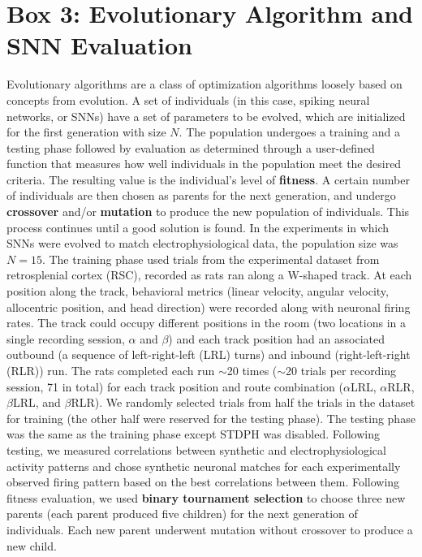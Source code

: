 \section{Box 3: Evolutionary Algorithm and SNN Evaluation}
\label{box:EA}
Evolutionary algorithms are a class of optimization algorithms loosely based on concepts from evolution. A set of individuals (in this case, spiking neural networks, or SNNs) have a set of parameters to be evolved, which are initialized for the first generation with size $N$. The population undergoes a training and a testing phase followed by evaluation as determined through a user-defined function that measures how well individuals in the population meet the desired criteria. The resulting value is the individual’s level of \textbf{fitness}. A certain number of individuals are then chosen as parents for the next generation, and undergo \textbf{crossover} and/or \textbf{mutation} to produce the new population of individuals. This process continues until a good solution is found.
In the experiments in which SNNs were evolved to match electrophysiological data, the population size was $N = 15$. The training phase used trials from the experimental dataset from retrosplenial cortex (RSC), recorded as rats ran along a W-shaped track. At each position along the track, behavioral metrics (linear velocity, angular velocity, allocentric position, and head direction) were recorded along with neuronal firing rates. The track could occupy different positions in the room (two locations in a single recording session, $\alpha$ and $\beta$) and each track position had an associated outbound (a sequence of left-right-left (LRL) turns) and inbound (right-left-right (RLR)) run. The rats completed each run $\sim$20 times ($\sim$20 trials per recording session, 71 in total) for each track position and route combination ($\alpha$LRL, $\alpha$RLR, $\beta$LRL, and $\beta$RLR). We randomly selected trials from half the trials in the dataset for training (the other half were reserved for the testing phase). The testing phase was the same as the training phase except STDPH was disabled. Following testing, we measured correlations between synthetic and electrophysiological activity patterns and chose synthetic neuronal matches for each experimentally observed firing pattern based on the best correlations between them. Following fitness evaluation, we used \textbf{binary tournament selection} to choose three new parents (each parent produced five children) for the next generation of individuals. Each new parent underwent mutation without crossover to produce a new child.
